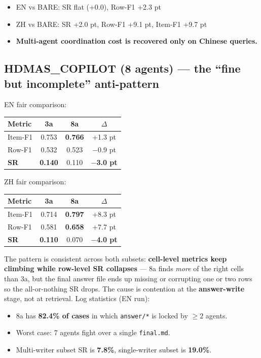 \documentclass[11pt]{article}
\newcommand{\code}[1]{\texttt{#1}}
\begin{document}
\begin{itemize}[leftmargin=1.2em]
  \item EN vs BARE: SR flat (+0.0), Row-F1 +2.3 pt
  \item ZH vs BARE: SR +2.0 pt, Row-F1 +9.1 pt, Item-F1 +9.7 pt
  \item \textbf{Multi-agent coordination cost is recovered only on Chinese queries.}
\end{itemize}

\subsection{HDMAS\_COPILOT (8 agents) --- the ``fine but incomplete'' anti-pattern}

EN fair comparison:

\begin{center}
\begin{tabular}{lccc}
\toprule
Metric    & 3a    & 8a            & $\Delta$ \\
\midrule
Item-F1   & 0.753 & \textbf{0.766} & +1.3 pt \\
Row-F1    & 0.532 & 0.523          & $-$0.9 pt \\
\textbf{SR} & \textbf{0.140} & 0.110 & \textbf{$-$3.0 pt} \\
\bottomrule
\end{tabular}
\end{center}

ZH fair comparison:

\begin{center}
\begin{tabular}{lccc}
\toprule
Metric    & 3a    & 8a            & $\Delta$ \\
\midrule
Item-F1   & 0.714 & \textbf{0.797} & +8.3 pt \\
Row-F1    & 0.581 & \textbf{0.658} & +7.7 pt \\
\textbf{SR} & \textbf{0.110} & 0.070 & \textbf{$-$4.0 pt} \\
\bottomrule
\end{tabular}
\end{center}

The pattern is consistent across both subsets: \textbf{cell-level metrics keep climbing while row-level SR collapses} --- 8a finds \emph{more} of the right cells than 3a, but the final answer file ends up missing or corrupting one or two rows so the all-or-nothing SR drops. The cause is contention at the \textbf{answer-write} stage, not at retrieval. Log statistics (EN run):
\begin{itemize}[leftmargin=1.2em]
  \item 8a has \textbf{82.4\% of cases} in which \code{answer/*} is locked by $\geq 2$ agents.
  \item Worst case: 7 agents fight over a single \code{final.md}.
  \item Multi-writer subset SR is \textbf{7.8\%}, single-writer subset is \textbf{19.0\%}.
\end{itemize}
\end{document}
